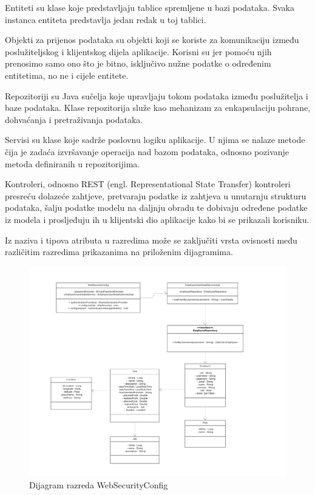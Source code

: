             Entiteti su klase koje predstavljaju tablice spremljene u bazi podataka. Svaka instanca entiteta predstavlja jedan redak u toj tablici.  

            Objekti za prijenos podataka su objekti koji se koriste za komunikaciju između poslužiteljskog i klijentskog dijela aplikacije. Korisni su jer pomoću njih prenosimo samo ono što je bitno, isključivo nužne podatke o određenim entitetima, no ne i cijele entitete. 
            
            Repozitoriji su Java sučelja koje upravljaju tokom podataka između poslužitelja i baze podataka. Klase repozitorija služe kao mehanizam za enkapsulaciju pohrane, dohvaćanja i pretraživanja podataka.  
            
            Servisi su klase koje sadrže poslovnu logiku aplikacije. U njima se nalaze metode čija je zadaća izvršavanje operacija nad bazom podataka, odnosno pozivanje metoda definiranih u repozitorijima. 
            
            Kontroleri, odnosno REST (engl. Representational State Transfer) kontroleri presreću dolazeće zahtjeve, pretvaraju podatke iz zahtjeva u unutarnju strukturu podataka, šalju podatke modelu na daljnju obradu te dobivaju određene podatke iz modela i prosljeđuju ih u klijentski dio aplikacije kako bi se prikazali korisniku.  
            
            Iz naziva i tipova atributa u razredima može se zaključiti vrsta ovisnosti među različitim razredima prikazanima na priloženim dijagramima. 
			
			
			\begin{figure}[H]
					\centering
					\includegraphics[width=\textwidth]{slike/Dijagram razreda - WebSecurityConfig.jpeg}
					\caption{Dijagram razreda WebSecurityConfig}
				\end{figure}
			
